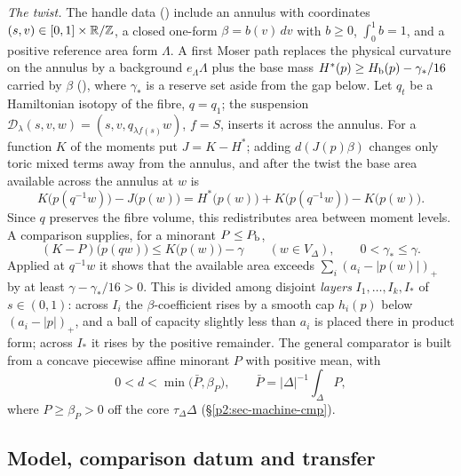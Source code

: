 \emph{The twist.} The handle data () include an annulus with coordinates
$(s,v)\in[0,1]\times\mathbb{R}/\mathbb{Z}$, a closed one-form $\beta=b(v)\,dv$ with $b\ge0$, $\int_0^1b=1$, and a positive reference
area form $\Lambda$. A first Moser path replaces the physical curvature on the annulus by a background
$e_\Lambda\Lambda$ plus the base mass $H^*(p)\ge H_{\mathrm b}(p)-\gamma_*/16$ carried by $\beta$
(), where $\gamma_*$ is a reserve set aside from the gap below. Let $q_t$ be a Hamiltonian
isotopy of the fibre, $q=q_1$; the suspension $\mathcal D_\lambda(s,v,w)=(s,v,q_{\lambda f(s)}w)$, $f=S$, inserts it
across the annulus. For a function $K$ of the moments put $J=K-H^*$; adding $d(J(p)\beta)$ changes only toric mixed
terms away from the annulus, and after the twist the base area available across the annulus at $w$ is
\begin{equation}\label{I:eq:mech-available}
 K\big(p(q^{-1}w)\big)-J\big(p(w)\big)
 =H^*\big(p(w)\big)+K\big(p(q^{-1}w)\big)-K\big(p(w)\big).
\end{equation}
Since $q$ preserves the fibre volume, this redistributes area between moment levels. A comparison supplies, for a
minorant $P\le P_{\mathrm b}$,
\begin{equation}\label{I:eq:mech-comparison}
 (K-P)\big(p(qw)\big)\le K\big(p(w)\big)-\gamma\qquad(w\in V_\Delta),
 \qquad 0<\gamma_*\le\gamma.
\end{equation}
Applied at $q^{-1}w$ it shows that the available area exceeds $\sum_i(a_i-|p(w)|)_+$ by at least
$\gamma-\gamma_*/16>0$. This is divided among disjoint \emph{layers} $I_1,\dots,I_k,I_*$ of $s\in(0,1)$: across $I_i$
the $\beta$-coefficient rises by a smooth cap $h_i(p)$ below $(a_i-|p|)_+$, and a ball of capacity slightly less than
$a_i$ is placed there in product form; across $I_*$ it rises by the positive remainder. The general comparator is
built from a concave piecewise affine minorant $P$ with positive mean, with
\begin{equation}\label{I:eq:mech-necessary}
 0<d<\min\bigl(\bar P,\beta_P\bigr),\qquad
 \bar P=|\Delta|^{-1}\int_\Delta P,
\end{equation}
where $P\ge\beta_P>0$ off the core $\tau_\Delta\Delta$ (\S\ref{p2:sec-machine-cmp}).

\subsection{Model, comparison datum and transfer}\label{I:sec:mech-interfaces}

